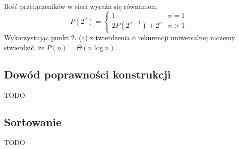 Ilość przełączeników w sieci wyraża się równaniem
$$
 P(2^n) = 
  \begin{cases} 
   1 & n = 1 \\
   2P(2^{n - 1}) + 2^n & n > 1
  \end{cases}
$$
Wykorzystując punkt 2. (a) z twierdzenia o rekurencji uniwersalnej możemy stwierdzić, że $P(n) = \Theta(n \log n)$.

\subsection{Dowód poprawności konstrukcji}
TODO
\subsection{Sortowanie}
TODO
